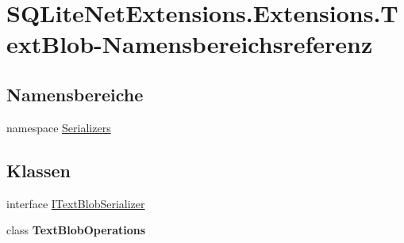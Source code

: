 \hypertarget{namespace_s_q_lite_net_extensions_1_1_extensions_1_1_text_blob}{}\section{S\+Q\+Lite\+Net\+Extensions.\+Extensions.\+Text\+Blob-\/\+Namensbereichsreferenz}
\label{namespace_s_q_lite_net_extensions_1_1_extensions_1_1_text_blob}
\subsection*{Namensbereiche}
\begin{DoxyCompactItemize}
\item 
namespace \mbox{\hyperlink{namespace_s_q_lite_net_extensions_1_1_extensions_1_1_text_blob_1_1_serializers}{Serializers}}
\end{DoxyCompactItemize}
\subsection*{Klassen}
\begin{DoxyCompactItemize}
\item 
interface \mbox{\hyperlink{interface_s_q_lite_net_extensions_1_1_extensions_1_1_text_blob_1_1_i_text_blob_serializer}{I\+Text\+Blob\+Serializer}}
\item 
class {\bfseries Text\+Blob\+Operations}
\end{DoxyCompactItemize}
